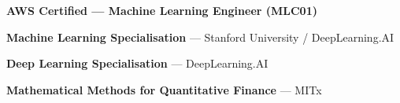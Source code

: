 \begin{resumeList}
    \item \textbf{AWS Certified --- Machine Learning Engineer (MLC01)}
    \item \textbf{Machine Learning Specialisation} --- Stanford University / DeepLearning.AI
    \item \textbf{Deep Learning Specialisation} --- DeepLearning.AI
    \item \textbf{Mathematical Methods for Quantitative Finance} --- MITx
\end{resumeList}